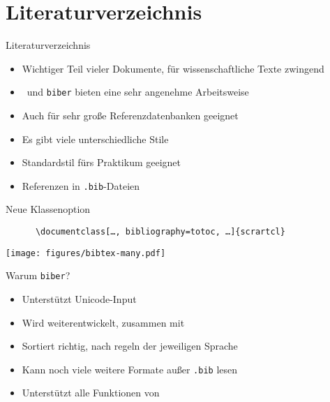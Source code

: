 \section{Literaturverzeichnis}

\begin{frame}[fragile]{Literaturverzeichnis}
  \begin{itemize}
    \item Wichtiger Teil vieler Dokumente, für wissenschaftliche Texte zwingend
    \item \BibLaTeX\ und \texttt{biber} bieten eine sehr angenehme Arbeitsweise
    \item Auch für sehr große Referenzdatenbanken geeignet
    \item Es gibt viele unterschiedliche Stile
    \item Standardstil fürs Praktikum geeignet
    \item Referenzen in \texttt{.bib}-Dateien
  \end{itemize}
  \begin{block}{Neue Klassenoption}
    \begin{lstlisting}
      \documentclass[…, bibliography=totoc, …]{scrartcl}
    \end{lstlisting}
  \end{block}
\end{frame}

\begin{frame}
  \centering
  \texttt{[image: figures/bibtex-many.pdf]}
\end{frame}

\begin{frame}{Warum \texttt{biber}?}
  \begin{itemize}
    \item Unterstützt Unicode-Input
    \item Wird weiterentwickelt, zusammen mit \BibLaTeX
    \item Sortiert richtig, nach regeln der jeweiligen Sprache
    \item Kann noch viele weitere Formate außer \texttt{.bib} lesen
    \item Unterstützt alle Funktionen von \BibLaTeX
  \end{itemize}
\end{frame}

